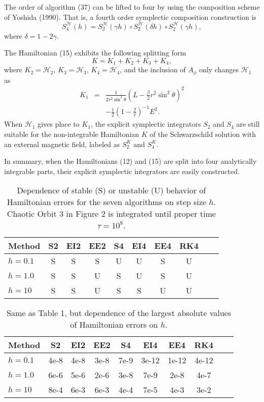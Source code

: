 \documentclass[preprint2]{aastex}
\begin{document}
The order of algorithm (37) can be lifted to four by using the
composition scheme of Yoshida (1990). That is, a fourth order
symplectic composition construction is
\begin{equation}
S^{\mathcal{H}}_4(h)=S^{\mathcal{H}}_2(\gamma h)\circ
S^{\mathcal{H}}_2(\delta h)\circ S^{\mathcal{H}}_2(\gamma h),
\end{equation}
where $\delta=1-2\gamma$.

The Hamiltonian (15) exhibits the following splitting form
\begin{equation}
K=K_1+K_2+K_3+K_4,
\end{equation}
where $K_2=\mathcal{H}_2$, $K_3=\mathcal{H}_3$,
$K_4=\mathcal{H}_4$, and the inclusion of $A_{\phi}$ only changes
$\mathcal{H}_1$ as
\begin{eqnarray}
K_{1} &=& \frac{1}{2r^2\sin^2\theta}(L-\frac{\beta}{2}
r^{2}\sin^{2} \theta)^{2} \nonumber \\ &&
-\frac{1}{2}(1-\frac{2}{r})^{-1} E^{2}.
\end{eqnarray}
When $\mathcal{H}_1$ gives place to $K_1$, the explicit symplectic
integrators $S_2$ and $S_4$ are still suitable for the
non-integrable Hamiltonian $K$ of the Schwarzschild solution with
an external magnetic field, labeled as $S^{K}_2$ and $S^{K}_4$.

In summary, when the Hamiltonians (12) and (15) are split into
four analytically integrable parts, their explicit symplectic
integrators are easily constructed.

\begin{table*}[htbp]
\centering \caption{Dependence of stable (S) or unstable (U)
behavior of Hamiltonian errors for the seven algorithms on step
size $h$. Chaotic Orbit 3 in Figure 2 is integrated until proper
time $\tau=10^{8}$.} \label{Tab1}
\begin{tabular}{lccccccccc}
\hline Method   & S2   & EI2 &  EE2  & S4  & EI4  & EE4  & RK4\\
\hline $h=0.1$  & S & S & S & U & U & S & U \\
\hline $h=1.0$ & S & S & U & S & U & S & U\\
\hline $h=10$  & S & S & U & S & S & U & U \\
\hline
\end{tabular}
\end{table*}

\begin{table*}[htbp]
\centering \caption{Same as Table 1, but dependence of the largest
absolute values of Hamiltonian errors on $h$.} \label{Tab2}
\begin{tabular}{lccccccccc}
\hline Method  & S2   & EI2 &  EE2  & S4  & EI4  & EE4  & RK4\\
\hline $h=0.1$ & 4e-8 & 4e-8 & 3e-8 & 7e-9  & 3e-12 & 1e-12 & 4e-12 \\
\hline $h=1.0$ & 6e-6 & 5e-6 & 2e-6 & 3e-8 & 7e-9 & 2e-8 & 4e-7\\
\hline $h=10$  & 8e-4 & 6e-3 & 6e-3 & 4e-4 & 7e-5 & 4e-3 & 3e-2 \\
\hline
\end{tabular}
\end{table*}
\end{document}
